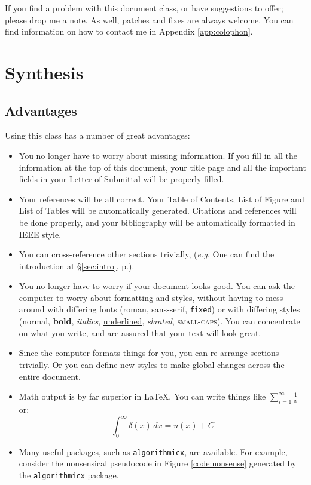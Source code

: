 \documentclass{uw-wkrpt}
\begin{document}
If you find a problem with this document class, or have suggestions to
offer; please drop me a note.  As well, patches and fixes are always
welcome.  You can find information on how to contact me in Appendix 
\ref{app:colophon}.

\section{Synthesis}

\subsection{Advantages}
Using this class has a number of great advantages:

\begin{itemize}
  \item You no longer have to worry about missing information.  If you fill
        in all the information at the top of this document, your title page
        and all the important fields in your Letter of Submittal will be
        properly filled.

  \item Your references will be all correct.  Your Table of Contents,
        List of Figure and List of Tables will be automatically generated.
        Citations and references will be done properly, and your bibliography
        will be automatically formatted in IEEE style.

  \item You can cross-reference other sections trivially, 
        (\emph{e.g.} One can find the introduction at \S\ref{sec:intro}, 
        p.\pageref{sec:intro}).

  \item You no longer have to worry if your document looks good.  You can
        ask the computer to worry about formatting and styles, without having to
        mess around with differing fonts (roman, \textsf{sans-serif},
        \texttt{fixed}) or with differing styles (normal, \textbf{bold},
        \textit{italics}, \underline{underlined}, \textsl{slanted},
        \textsc{small-caps}).  You can concentrate on what you write, and are
        assured that your text will look great.

  \item Since the computer formats things for you, you can re-arrange
        sections trivially.  Or you can define new styles to make global changes
        across the entire document.

  \item Math output is by far superior in \LaTeX.  You can write things
        like $\sum_{i=1}^{\infty} \frac{1}{x}$ or:
        \[\int_{0}^{\infty} \delta(x)\,dx = u(x) + C\]

  \item Many useful packages, such as \texttt{algorithmicx}, are available. For
        example, consider the nonsensical pseudocode in Figure
        \ref{code:nonsense} generated by the \texttt{algorithmicx} package.
\end{itemize}
\end{document}
